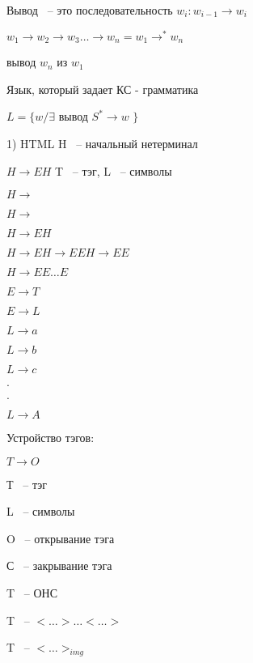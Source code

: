 \documentclass[russian]{lecture-notes}
\begin{document}
	\begin{definition}

		Вывод ~-- это последовательность $w_{i} : w_{i-1} \rightarrow w_{i}$

		\end{definition}

	$w_{1} \rightarrow w_{2} \rightarrow w_{3} \dots \rightarrow w_{n} = w_{1} \rightarrow^{*} w_{n}$

	вывод $w_{n} $ из $w_{1}$

	\begin{definition}

		Язык, который задает КС - грамматика

		$L = \{ w/ \exists $ вывод $S^{*} \rightarrow w$ $\}$

		\end{definition}

	\begin{example}

		1) HTML \qquad H ~-- начальный нетерминал

		$H \rightarrow EH$ \qquad \qquad \qquad T ~-- тэг, L ~-- символы

		$H \rightarrow$

		$H \rightarrow $

		$H \rightarrow EH$

		$H \rightarrow EH \rightarrow EEH \rightarrow EE$

		$H \rightarrow EE \dots E$

		$E \rightarrow T$

		$E \rightarrow L$

		$L \rightarrow a$

		$L \rightarrow b$

		$L \rightarrow c$

		$.$

		$.$

		$L \rightarrow A$

		\end{example}

	Устройство тэгов:

	$T \rightarrow O$

	Т ~-- тэг

	L ~-- символы

	O ~-- открывание тэга

	С ~-- закрывание тэга

	T ~-- ОНС

	T ~-- $< \dots > \dots <\dots>$

	T ~-- $< \dots >_{img}$
\end{document}
